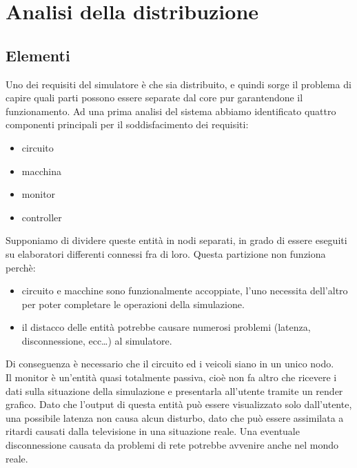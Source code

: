 \chapter{Analisi della distribuzione} %

\label{Chapter5} %



\section{Elementi}

Uno dei requisiti del simulatore è che sia distribuito, e quindi sorge il problema di capire quali parti possono essere separate dal core pur garantendone il funzionamento.
Ad una prima analisi del sistema abbiamo identificato quattro componenti principali per il soddisfacimento dei requisiti:
\begin{itemize}
 \item circuito
 \item macchina
 \item monitor
 \item controller
\end{itemize}
Supponiamo di dividere queste entità in nodi separati, in grado di essere eseguiti su elaboratori differenti connessi fra di loro. 
Questa partizione non funziona perchè:
\begin{itemize}
\item circuito e macchine sono funzionalmente accoppiate, l'uno necessita dell'altro per poter completare le operazioni della simulazione.
\item il distacco delle entità potrebbe causare numerosi problemi (latenza, disconnessione, ecc…) al simulatore. 
\end{itemize}
Di conseguenza è necessario che il circuito ed i veicoli siano in un unico nodo. \\

Il monitor è un’entità quasi totalmente passiva, cioè non fa altro che ricevere i dati sulla situazione della simulazione e presentarla all’utente tramite un render grafico. Dato che l’output di questa entità può essere visualizzato solo dall’utente, una possibile latenza non causa alcun disturbo, dato che può essere assimilata a ritardi causati dalla televisione in una situazione reale. Una eventuale disconnessione causata da problemi di rete potrebbe avvenire anche nel mondo reale. \\
 
